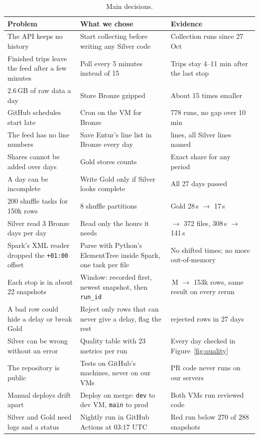 \documentclass[11pt,a4paper]{article}
\newcommand{\rowline}{\arrayrulecolor{black!25}\midrule\arrayrulecolor{black}}
\newcommand{\code}[1]{\texttt{#1}}
\begin{document}
\begin{table}[htb]
\centering\small
\renewcommand{\arraystretch}{1.3}
\begin{tabularx}{\linewidth}{@{}>{\raggedright}p{4.3cm}>{\raggedright}X>{\raggedright\arraybackslash}p{4.3cm}@{}}
\toprule
Problem & What we chose & Evidence \\
\midrule
The API keeps no history & Start collecting before writing any Silver code & Collection runs since 27 Oct \\ \rowline
Finished trips leave the feed after a few minutes & Poll every 5 minutes instead of 15 & Trips stay 4--11 min after the last stop \\ \rowline
2.6\,GB of raw data a day & Store Bronze gzipped & About 15 times smaller \\ \rowline
GitHub schedules start late & Cron on the VM for Bronze & 7{,}778 runs, no gap over 10 min \\ \rowline
The feed has no line numbers & Save Entur's line list in Bronze every day & 320 lines, all Silver lines named \\ \rowline
Shares cannot be added over days & Gold stores counts & Exact share for any period \\ \rowline
A day can be incomplete & Write Gold only if Silver looks complete & All 27 days passed \\ \rowline
200 shuffle tasks for 150k rows & 8 shuffle partitions & Gold 28\,s $\rightarrow$ 17\,s \\ \rowline
Silver read 3 Bronze days per day & Read only the hours it needs & 864 $\rightarrow$ 372 files, 308\,s $\rightarrow$ 141\,s \\ \rowline
Spark's XML reader dropped the \code{+01:00} offset & Parse with Python's ElementTree inside Spark, one task per file & No shifted times; no more out-of-memory \\ \rowline
Each stop is in about 22 snapshots & Window: recorded first, newest snapshot, then \code{run\_id} & 3.4\,M $\rightarrow$ 153k rows, same result on every rerun \\ \rowline
A bad row could hide a delay or break Gold & Reject only rows that can never give a delay, flag the rest & 0 rejected rows in 27 days \\ \rowline
Silver can be wrong without an error & Quality table with 23 metrics per run & Every day checked in Figure~\ref{fig:quality} \\ \rowline
The repository is public & Tests on GitHub's machines, never on our VMs & PR code never runs on our servers \\ \rowline
Manual deploys drift apart & Deploy on merge: \code{dev} to dev VM, \code{main} to prod & Both VMs run reviewed code \\ \rowline
Silver and Gold need logs and a status & Nightly run in GitHub Actions at 03:17 UTC & Red run below 270 of 288 snapshots \\
\bottomrule
\end{tabularx}
\caption{Main decisions.}
\label{tab:decisions}
\end{table}
\end{document}
